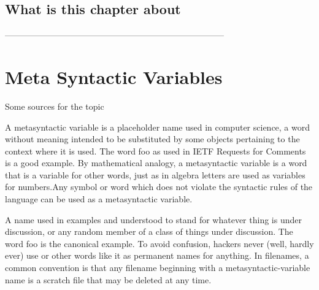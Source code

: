 \documentclass[thesis-solanki.tex]{subfiles}
\begin{document}
\section{What is this chapter about}

-----------------------------------------------------------------------------


\chapter{Meta Syntactic Variables}\label{chap:metasyntacticvariables}

Some sources for the topic 


\cite{website:metasyntacticvariableswiki}
A metasyntactic variable is a placeholder name used in computer science, a word without meaning intended to be substituted by some objects pertaining to the context where it is used. The word foo as used in IETF Requests for Comments is a good example.
By mathematical analogy, a metasyntactic variable is a word that is a variable for other words, just as in algebra letters are used as variables for numbers.Any symbol or word which does not violate the syntactic rules of the language can be used as a metasyntactic variable.




\cite{webiste:metasyntacticvariablescatb}
A name used in examples and understood to stand for whatever thing is under discussion, or any random member of a class of things under discussion. The word foo is the canonical example. To avoid confusion, hackers never (well, hardly ever) use 
or other words like it as permanent names for anything. In filenames, a common convention is that any filename beginning with a metasyntactic-variable name is a scratch file that may be deleted at any time.
\end{document}
